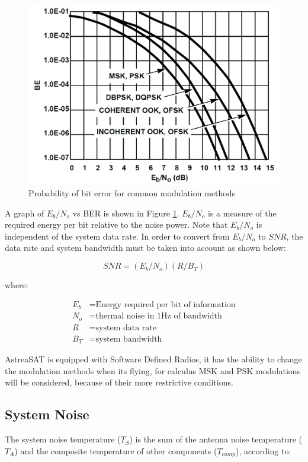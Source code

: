 \begin{figure}[H]
	\includegraphics[scale=0.3]{./sections/SatelliteDept/sections/images/BEvsSNR}
	\centering
	\caption[Probability of bit error for common modulation methods]{Probability of bit error for common modulation methods \cite{Note1998}}
	\label{BEvsSNR}
\end{figure}

A graph of $E_b/N_o$ vs BER is shown in Figure \ref{BEvsSNR}. $E_b/N_o$ is a measure of the required energy per bit relative to the noise power. Note that $E_b/N_o$ is independent of the system data rate. In order to convert from $E_b/N_o$ to $SNR$, the data rate and system bandwidth must be taken into account as shown below:

\begin{equation}
SNR=(E_b/N_o)(R/B_T)
\label{SNReq}
\end{equation}

where:

\begin{align*}
	E_b&= \text{Energy required per bit of information}\\
	N_o&= \text{thermal noise in 1Hz of bandwidth}\\
	R&= \text{system data rate}\\
	B_T&= \text{system bandwidth}
\end{align*}

AstreaSAT is equipped with Software Defined Radios, it has the ability to change the modulation methods when its flying, for calculus MSK and PSK modulations will be considered, because of their more restrictive conditions.

\subsection{System Noise}
The system noise temperature ($T_S$) is the sum of the antenna noise temperature ($T_A$) and the composite temperature of other components ($T_{comp}$), according to:    \cite{Jorge2012}

